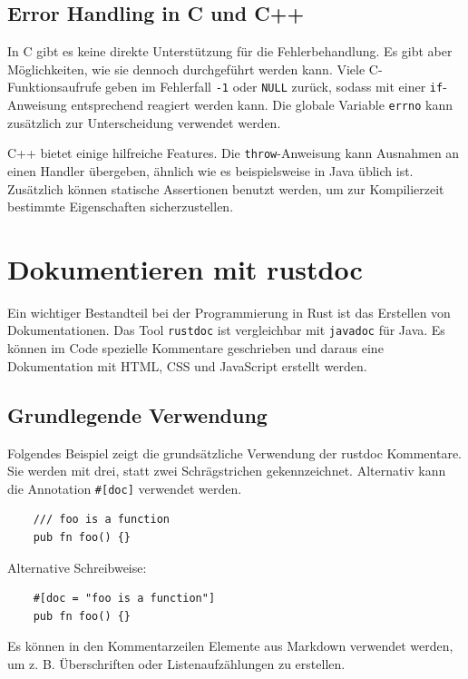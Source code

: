 \subsection{Error Handling in C und C++}

In C gibt es keine direkte Unterstützung für die Fehlerbehandlung. Es gibt aber Möglichkeiten, wie sie dennoch durchgeführt werden kann. Viele C-Funk\-ti\-ons\-auf\-ru\-fe geben im Fehlerfall \verb"-1" oder \verb"NULL" zurück, sodass mit einer \verb"if"-Anweisung entsprechend reagiert werden kann. Die globale Variable \verb"errno" kann zusätzlich zur Unterscheidung verwendet werden.

C++ bietet einige hilfreiche Features. Die \verb"throw"-Anweisung kann Ausnahmen an einen Handler übergeben, ähnlich wie es beispielsweise in Java üblich ist. Zusätzlich können statische Assertionen benutzt werden, um zur Kompilierzeit bestimmte Eigenschaften sicherzustellen.


\section{Dokumentieren mit rustdoc}

Ein wichtiger Bestandteil bei der Programmierung in Rust ist das Erstellen von Dokumentationen. Das Tool \verb"rustdoc" ist vergleichbar mit \verb"javadoc" für Java. Es können im Code spezielle Kommentare geschrieben  und daraus eine Dokumentation mit HTML, CSS und JavaScript erstellt werden.

\subsection{Grundlegende Verwendung}

Folgendes Beispiel zeigt die grundsätzliche Verwendung der rustdoc Kommentare. Sie werden mit drei, statt zwei Schrägstrichen gekennzeichnet. Alternativ kann die Annotation \verb"#[doc]" verwendet werden.

\begin{lstlisting}
    /// foo is a function
    pub fn foo() {}
\end{lstlisting}

Alternative Schreibweise:

\begin{lstlisting}
    #[doc = "foo is a function"]
    pub fn foo() {}
\end{lstlisting}

Es können in den Kommentarzeilen Elemente aus Markdown verwendet werden, um z. B. Überschriften oder Listenaufzählungen zu erstellen.


